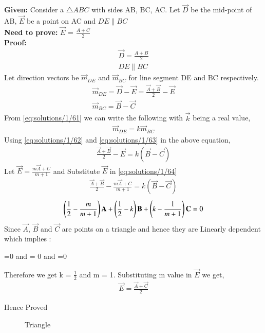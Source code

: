 
\textbf{Given:} Consider a $\triangle{ABC}$ with sides AB, BC, AC. Let $\vec{D}$ be the mid-point of AB, $\vec{E}$ be a point on AC and $DE\parallel{BC}$\\
\textbf{Need to prove:} $\vec{E}$ = $ \frac{A+C}{2}$\\
\textbf{Proof:}
\begin{align}
\vec{D} = \frac{A+B}{2} \\
DE\parallel{BC}\label{eq:solutions/1/61}
\end{align}
Let direction vectors be  $\vec{m}_{DE}$ and  $\vec{m}_{BC}$ for line segment DE and BC respectively.
\begin{align}
 \vec{m}_{DE} = \vec{D} - \vec{E} = \frac{\vec{A}+\vec{B}}{2}-\vec{E} \label{eq:solutions/1/62}\\
 \vec{m}_{BC} = \vec{B}-\vec{C}\label{eq:solutions/1/63}
\end{align}
From \eqref{eq:solutions/1/61} we can write the following with $\vec{k}$ being a real value,
\begin{align}
 \vec{m}_{DE} = k \vec{m}_{BC} \label{eq:solutions/1/64}
\end{align} 
Using \eqref{eq:solutions/1/62} and \eqref{eq:solutions/1/63} in the above equation,
\begin{align}
\frac{\vec{A}+\vec{B}}{2}-\vec{E} = k (\vec{B}-\vec{C}) 
\end{align}
Let $\vec{E} = \frac{m\vec{A}+C}{m+1} \label{eq:solutions/1/65}$ and Substitute $\vec{E}$ in \eqref{eq:solutions/1/64}
\begin{align}
\frac{\vec{A}+\vec{B}}{2}- \frac{m\vec{A}+C}{m+1} = k(\vec{B}-\vec{C})
\end{align}
\begin{align}
\left(\frac{1}{2}-\frac{m}{m+1}\right)\mathbf{A}+\left(\frac{1}{2}-k\right)\mathbf{B}+\left(k-\frac{1}{m+1}\right)\mathbf{C} = 0
\end{align}
Since $\vec{A}$, $\vec{B}$ and $\vec{C}$ are points on a triangle and hence they are Linearly dependent which implies :
\begin{center}
=0 and  = 0 and  =0 
\end{center}
Therefore we get k = $\frac{1}{2}$ and m = 1.
Substituting m value in $\vec{E}$ we get,
\begin{align}
\vec{E} =  \frac{\vec{A}+\vec{C}}{2}
\end{align} 
\begin{center}
Hence Proved
\end{center}

\begin{figure}[!ht]
\centering
\resizebox{\columnwidth}{!}{}
\caption{Triangle}
\label{fig:Triangle}
\end{figure}
